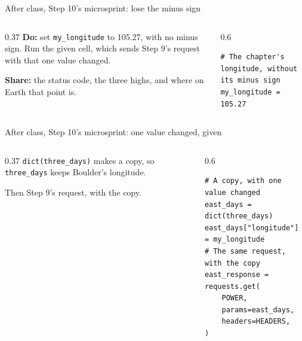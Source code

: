 \documentclass[9pt,aspectratio=169]{beamer}
\begin{document}
\begin{frame}[fragile]{After class, Step 10's microsprint: lose the minus sign}
    \begin{columns}[T]
        \begin{column}{0.37\textwidth}
            \textbf{Do:} set \texttt{my\_longitude} to 105.27, with no minus sign. Run the given cell, which sends Step 9's request with that one value changed.

            \medskip
            \textbf{Share:} the status code, the three highs, and where on Earth that point is.
        \end{column}
        \begin{column}{0.6\textwidth}
\begin{lstlisting}
# The chapter's longitude, without its minus sign
my_longitude = 105.27
\end{lstlisting}
        \end{column}
    \end{columns}
\end{frame}

\begin{frame}[fragile]{After class, Step 10's microsprint: one value changed, given}
    \begin{columns}[T]
        \begin{column}{0.37\textwidth}
            \texttt{dict(three\_days)} makes a copy, so \texttt{three\_days} keeps Boulder's longitude.

            \medskip
            Then Step 9's request, with the copy.
        \end{column}
        \begin{column}{0.6\textwidth}
\begin{lstlisting}
# A copy, with one value changed
east_days = dict(three_days)
east_days["longitude"] = my_longitude
# The same request, with the copy
east_response = requests.get(
    POWER,
    params=east_days,
    headers=HEADERS,
)
\end{lstlisting}
        \end{column}
    \end{columns}
\end{frame}
\end{document}
